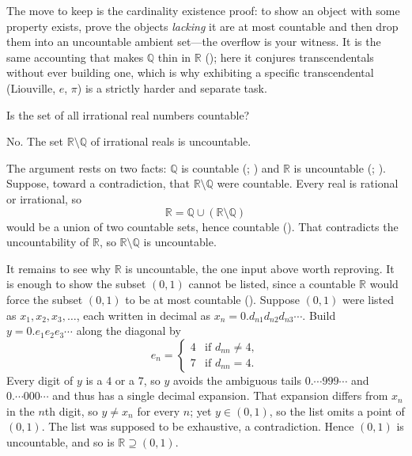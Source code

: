 \documentclass[main.tex]{subfiles}
\begin{document}
\begin{Reflection}
The move to keep is the cardinality existence proof: to show an object with some property exists,
prove the objects \emph{lacking} it are at most countable and then drop them into an uncountable
ambient set---the overflow is your witness. It is the same accounting that makes $\mathbb Q$ thin in
$\mathbb R$ (); here it conjures transcendentals without ever building one, which is why
exhibiting a specific transcendental (Liouville, $e$, $\pi$) is a strictly harder and separate task.
\end{Reflection}

Is the set of all irrational real numbers countable?

\begin{Solution}
No. The set $\mathbb R\setminus\mathbb Q$ of irrational reals is uncountable.

The argument rests on two facts: $\mathbb Q$ is countable (;
) and $\mathbb R$ is uncountable (;
). Suppose, toward a contradiction, that $\mathbb R\setminus\mathbb Q$ were countable.
Every real is rational or irrational, so
\[
\mathbb R=\mathbb Q\cup(\mathbb R\setminus\mathbb Q)
\]
would be a union of two countable sets, hence countable
(). That contradicts
the uncountability of $\mathbb R$, so $\mathbb R\setminus\mathbb Q$ is uncountable.

It remains to see why $\mathbb R$ is uncountable, the one input above worth reproving. It is enough to
show the subset $(0,1)$ cannot be listed, since a countable $\mathbb R$ would force the subset
$(0,1)$ to be at most countable (). Suppose $(0,1)$ were listed as $x_1,x_2,x_3,\dots$, each written in decimal as
$x_n=0.d_{n1}d_{n2}d_{n3}\cdots$. Build $y=0.e_1e_2e_3\cdots$ along the diagonal by
\[
e_n=\begin{cases} 4 & \text{if } d_{nn}\neq 4,\\[2pt] 7 & \text{if } d_{nn}=4.\end{cases}
\]
Every digit of $y$ is a $4$ or a $7$, so $y$ avoids the ambiguous tails $0.\!\cdots\!999\cdots$ and
$0.\!\cdots\!000\cdots$ and thus has a single decimal expansion. That expansion differs from $x_n$ in
the $n$th digit, so $y\neq x_n$ for every $n$; yet $y\in(0,1)$, so the list omits a point of
$(0,1)$. The list was supposed to be exhaustive, a contradiction. Hence $(0,1)$ is uncountable, and so
is $\mathbb R\supseteq(0,1)$.
\end{Solution}
\end{document}
